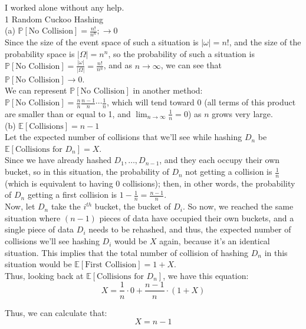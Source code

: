 \documentclass{article}
\begin{document}
I worked alone without any help. \\[1cm]
{\Large 1 Random Cuckoo Hashing} \\[.5cm]
{\color{red} (a) $\mathbb{P}[\text{No Collision}] = \frac{n!}{n^n}; \longrightarrow0$} \\

Since the size of the event space of such a situation is $|\omega| = n!$, and the size of the probability space is $|\Omega| = n^n$, so the probability of such a situation is $\mathbb{P}[\text{No Collision}] = \frac{|\omega|}{|\Omega|} = \frac{n!}{n^n}$, and as $n\rightarrow\infty$, we can see that $\mathbb{P}[\text{No Collision}]\rightarrow0$. \\

We can represent $\mathbb{P}[\text{No Collision}]$ in another method:
$\mathbb{P}[\text{No Collision}] = \frac{n}{n}\frac{n-1}{n}\cdots\frac{1}{n}$, which will tend toward 0 (all terms of this product are smaller than or equal to 1, and $\lim_{n\rightarrow\infty}\frac{1}{n}=0$) as $n$ grows very large. \\[.5cm]
{\color{red} (b) $\mathbb{E}[\text{Collisions}] = n-1$} \\

Let the expected number of collisions that we’ll see while hashing $D_n$ be $\mathbb{E}[\text{Collisions for }D_n] = X$. \\

Since we have already hashed $D_1,\dots,D_{n-1}$, and they each occupy their own bucket, so in this situation, the probability of $D_n$ not getting a collision is $\frac{1}{n}$ (which is equivalent to having 0 collisions); then, in other words, the probability of $D_n$ getting a first collision is $1-\frac{1}{n} = \frac{n-1}{n}$. \\

Now, let $D_n$ take the $i^{th}$ bucket, the bucket of $D_i$. So now, we reached the same situation where $(n-1)$ pieces of data have occupied their own buckets, and a single piece of data $D_i$ needs to be rehashed, and thus, the expected number of collisions we'll see hashing $D_i$ would be $X$ again, because it's an identical situation. This implies that the total number of collision of hashing $D_n$ in this situation would be $\mathbb{E}[\text{First Collision}] = 1+X$. \\

Thus, looking back at $\mathbb{E}[\text{Collisions for }D_n]$, we have this equation:
$$ X = \frac{1}{n}\cdot0 + \frac{n-1}{n}\cdot(1+X)$$

Thus, we can calculate that:
$$X = n-1$$
\end{document}
